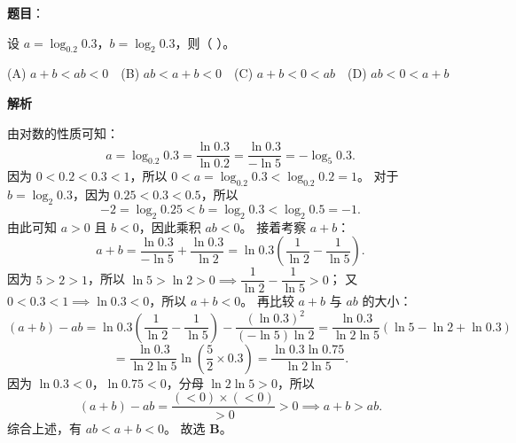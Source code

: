 \begin{answer}

\textbf{题目}：

设 $a = \log_{0.2} 0.3$，$b = \log_2 0.3$，则（ ）。

(A) $a + b < ab < 0$　(B) $ab < a + b < 0$　(C) $a + b < 0 < ab$　(D) $ab < 0 < a + b$

\textbf{解析}

由对数的性质可知：
\nopagebreak[4]
\[a = \log_{0.2} 0.3 = \dfrac{\ln 0.3}{\ln 0.2} = \dfrac{\ln 0.3}{-\ln 5} = -\log_5 0.3.\]
因为 $0 < 0.2 < 0.3 < 1$，所以 $0 < a = \log_{0.2} 0.3 < \log_{0.2} 0.2 = 1$。
对于 $b = \log_2 0.3$，因为 $0.25 < 0.3 < 0.5$，所以
\nopagebreak[4]
\[-2 = \log_2 0.25 < b = \log_2 0.3 < \log_2 0.5 = -1.\]
由此可知 $a > 0$ 且 $b < 0$，因此乘积 $ab < 0$。
接着考察 $a + b$：
\nopagebreak[4]
\[a + b = \dfrac{\ln 0.3}{-\ln 5} + \dfrac{\ln 0.3}{\ln 2} = \ln 0.3 \left(\dfrac{1}{\ln 2} - \dfrac{1}{\ln 5}\right).\]
因为 $5 > 2 > 1$，所以 $\ln 5 > \ln 2 > 0 \implies \dfrac{1}{\ln 2} - \dfrac{1}{\ln 5} > 0$；
又 $0 < 0.3 < 1 \implies \ln 0.3 < 0$，所以 $a + b < 0$。
再比较 $a + b$ 与 $ab$ 的大小：
\nopagebreak[4]
\[(a + b) - ab = \ln 0.3 \left(\dfrac{1}{\ln 2} - \dfrac{1}{\ln 5}\right) - \dfrac{(\ln 0.3)^2}{(-\ln 5)\ln 2} = \dfrac{\ln 0.3}{\ln 2 \ln 5} \left(\ln 5 - \ln 2 + \ln 0.3\right)\]
\nopagebreak[4]
\[= \dfrac{\ln 0.3}{\ln 2 \ln 5} \ln\left(\dfrac52 \times 0.3\right) = \dfrac{\ln 0.3 \ln 0.75}{\ln 2 \ln 5}.\]
因为 $\ln 0.3 < 0$，$\ln 0.75 < 0$，分母 $\ln 2 \ln 5 > 0$，所以
\nopagebreak[4]
\[(a + b) - ab = \dfrac{(<0) \times (<0)}{>0} > 0 \implies a + b > ab.\]
综合上述，有 $ab < a + b < 0$。
故选 \textbf{B}。


\par\medskip

\end{answer}

